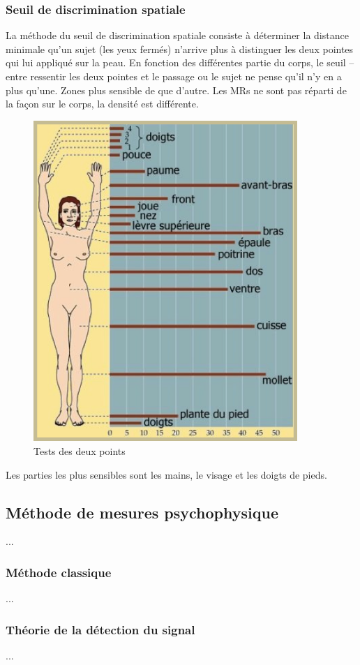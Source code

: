 \subsubsection{Seuil de discrimination spatiale}
La méthode du seuil de discrimination spatiale consiste à déterminer la distance minimale qu’un sujet (les yeux fermés) n’arrive plus à distinguer les deux pointes qui lui appliqué sur la peau. En fonction des différentes partie du corps, le seuil – entre ressentir les deux pointes et le passage ou le sujet ne pense qu’il n’y en a plus qu’une. Zones plus sensible de que d’autre. Les MRs ne sont pas réparti de la façon sur le corps, la densité est différente.\par
\begin{figure}[!h]
	\centering
	\includegraphics[width=10cm]{Photos/discrim_spatiale.png}
	\caption{Tests des deux points}\label{discrim_spatiale}
\end{figure}
Les parties les plus sensibles sont les mains, le visage et les doigts de pieds.

\subsection{Méthode de mesures psychophysique}
...

\subsubsection{Méthode classique}
...

\subsubsection{Théorie de la détection du signal}
...




